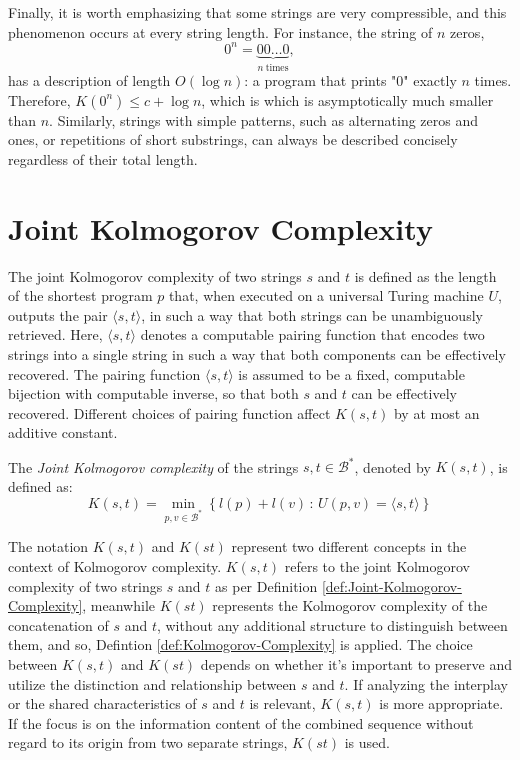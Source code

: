 Finally, it is worth emphasizing that some strings are very compressible, and this phenomenon occurs at every string length. For instance, the string of $n$ zeros,
\[
0^n = \underbrace{00\ldots0}_{n\ \text{times}},
\]
has a description of length $O(\log n)$: a program that prints "0" exactly $n$ times. Therefore, $K(0^n) \leq c + \log n$, which is which is asymptotically much smaller than $n$. Similarly, strings with simple patterns, such as alternating zeros and ones, or repetitions of short substrings, can always be described concisely regardless of their total length.

%
%

\section{Joint Kolmogorov Complexity}

The joint Kolmogorov complexity of two strings $s$ and $t$ is defined as the length of the shortest program $p$ that, when executed on a universal Turing machine $U$, outputs the pair $\langle s, t \rangle$, in such a way that both strings can be unambiguously retrieved. Here, $\langle s,t\rangle$ denotes a computable pairing function that encodes two strings into a single string in such a way that both components can be effectively recovered. The pairing function $\langle s,t\rangle$ is assumed to be a fixed, computable bijection with computable inverse, so that both $s$ and $t$ can be effectively recovered. Different choices of pairing function affect $K(s,t)$ by at most an additive constant.

\begin{definition}
\label{def:Joint-Kolmogorov-Complexity}
The \emph{Joint Kolmogorov complexity} of the strings $s, t \in \mathcal{B}^\ast$, denoted by $K(s, t)$, is defined as:
\[
K(s, t)=\min_{p,v \in \mathcal{B}^\ast}\left\{l(p) + l(v)\,:\, U(p,v)=\langle s, t \rangle \right\}
\]
\end{definition}

The notation $K(s, t)$ and $K(st)$ represent two different concepts in the context of Kolmogorov complexity. $K(s, t)$ refers to the joint Kolmogorov complexity of two strings $s$ and $t$ as per Definition \ref{def:Joint-Kolmogorov-Complexity}, meanwhile $K(st)$ represents the Kolmogorov complexity of the concatenation of $s$ and $t$, without any additional structure to distinguish between them, and so, Defintion \ref{def:Kolmogorov-Complexity} is applied. The choice between $K(s, t)$ and $K(st)$ depends on whether it's important to preserve and utilize the distinction and relationship between $s$ and $t$. If analyzing the interplay or the shared characteristics of $s$ and $t$ is relevant, $K(s, t)$ is more appropriate. If the focus is on the information content of the combined sequence without regard to its origin from two separate strings, $K(st)$ is used.

